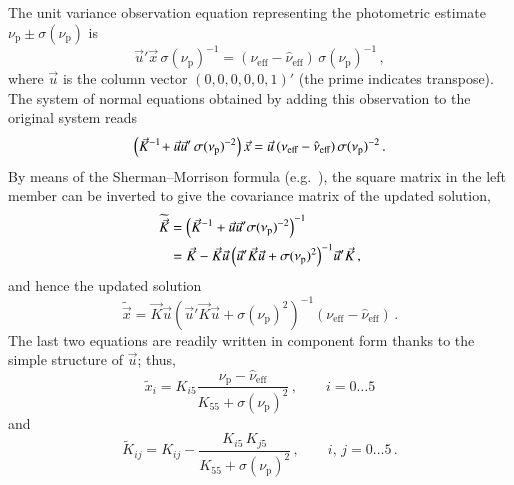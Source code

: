 \documentclass[longauth]{aa} %
\newcommand{\phat}[1]{{#1}}
\begin{document}
The unit variance observation equation representing the photometric estimate 
$\nu_\text{p}\pm\sigma(\nu_\text{p})$ is
\begin{equation}\label{eq:u}
\vec{u}'\vec{x}\,\sigma(\nu_\text{p})^{-1} 
= (\nu_\text{eff}-\hat{\nu}_\text{eff})\,\sigma(\nu_\text{p})^{-1} \, ,
\end{equation}
where $\vec{u}$ is the column vector $(0,0,0,0,0,1)'$ (the prime indicates transpose). 
The system of normal equations obtained by adding this observation to the original system reads
\begin{equation}\label{eq:Nhatp}
\Bigl(\phat{\vec{K}}^{-1}\!+\vec{u}\vec{u}'\,\sigma(\nu_\text{p})^{-2}\Bigr) \,\vec{x} 
= \vec{u}\,(\nu_\text{eff}-\hat{\nu}_\text{eff})\,\sigma(\nu_\text{p})^{-2} \, .
\end{equation}
By means of the Sherman--Morrison formula (e.g.\ ), the square matrix in
the left member can be inverted to give the covariance matrix of the updated solution,
\begin{equation}\label{eq:Ctilde}
\begin{split}
\widetilde{\vec{K}} &= \Bigl(\phat{\vec{K}}^{-1}+\vec{u}\vec{u}'\sigma(\nu_\text{p})^{-2}\Bigr)^{-1}\\
&= \phat{\vec{K}} - \phat{\vec{K}}\vec{u}\left(\vec{u}'\phat{\vec{K}}\vec{u}
+\sigma(\nu_\text{p})^2\right)^{-1}\!\vec{u}'\phat{\vec{K}}\, ,
\end{split}
\end{equation}
and hence the updated solution
\begin{equation}\label{eq:xtilde}
\widetilde{\vec{x}} 
= \phat{\vec{K}}\vec{u}\left(\vec{u}'\phat{\vec{K}}\vec{u}+\sigma(\nu_\text{p})^2\right)^{-1}
(\nu_\text{eff}-\hat{\nu}_\text{eff})\, .
\end{equation}
The last two equations are readily written in component form thanks to the simple structure of 
$\vec{u}$; thus,
\begin{equation}\label{eq:xtildeComp}
\widetilde{x}_i = \phat{K}_{i5}\frac{\nu_\text{p}-\hat{\nu}_\text{eff}}{\phat{K}_{55}+\sigma(\nu_\text{p})^2}\, ,
\qquad i=0\dots 5  
\end{equation}
and
\begin{equation}\label{eq:CtildeComp}
\widetilde{K}_{ij} = \phat{K}_{ij}-\frac{\phat{K}_{i5}\,\phat{K}_{j5}}{\phat{K}_{55}+\sigma(\nu_\text{p})^2}\, ,
\qquad i,\,j=0\dots 5\, .
\end{equation}
\end{document}
